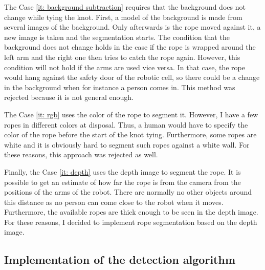             The Case \ref{it: background subtraction} requires that the background does not change while tying the knot. First, a model of the background is made from several images of the background. Only afterwards is the rope moved against it, a new image is taken and the segmentation starts. The condition that the background does not change holds in the case if the rope is wrapped around the left arm and the right one then tries to catch the rope again. However, this condition will not hold if the arms are used vice versa. In that case, the rope would hang against the safety door of the robotic cell, so there could be a change in the background when for instance a person comes in. This method was rejected because it is not general enough.

            The Case \ref{it: rgb} uses the color of the rope to segment it. However, I have a few ropes in different colors at disposal. Thus, a human would have to specify the color of the rope before the start of the knot tying. Furthermore, some ropes are white and it is obviously hard to segment such ropes against a white wall. For these reasons, this approach was rejected as well.

            Finally, the Case \ref{it: depth} uses the depth image to segment the rope. It is possible to get an estimate of how far the rope is from the camera from the positions of the arms of the robot. There are normally no other objects around this distance as no person can come close to the robot when it moves. Furthermore, the available ropes are thick enough to be seen in the depth image. For these reasons, I decided to implement rope segmentation based on the depth image.

        \subsection{Implementation of the detection algorithm}

